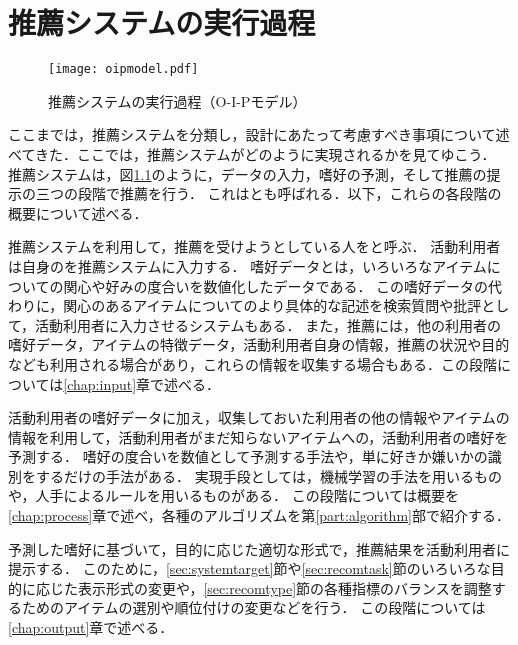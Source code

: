 \chapter{推薦システムの実行過程}
\label{chap:oipmodel}

\begin{figure}
\centering
\texttt{[image: oipmodel.pdf]}
\caption{推薦システムの実行過程（O-I-Pモデル）}
\label{fig:oipmodel}
\end{figure}

ここまでは，推薦システムを分類し，設計にあたって考慮すべき事項について述べてきた．ここでは，推薦システムがどのように実現されるかを見てゆこう．
推薦システムは，図\ref{fig:oipmodel}のように，データの入力，嗜好の予測，そして推薦の提示の三つの段階で推薦を行う．
これは\cite{sigchi:03:01}とも呼ばれる．以下，これらの各段階の概要について述べる．

\begin{description}[style=nextline]
\item[データの入力]
推薦システムを利用して，推薦を受けようとしている人をと呼ぶ．
活動利用者は自身のを推薦システムに入力する．
嗜好データとは，いろいろなアイテムについての関心や好みの度合いを数値化したデータである．
この嗜好データの代わりに，関心のあるアイテムについてのより具体的な記述を検索質問や批評として，活動利用者に入力させるシステムもある．
また，推薦には，他の利用者の嗜好データ，アイテムの特徴データ，活動利用者自身の情報，推薦の状況や目的なども利用される場合があり，これらの情報を収集する場合もある．この段階については\ref{chap:input}章で述べる．
\item[嗜好の予測]
活動利用者の嗜好データに加え，収集しておいた利用者の他の情報やアイテムの情報を利用して，活動利用者がまだ知らないアイテムへの，活動利用者の嗜好を予測する．
嗜好の度合いを数値として予測する手法や，単に好きか嫌いかの識別をするだけの手法がある．
実現手段としては，機械学習の手法を用いるものや，人手によるルールを用いるものがある．
この段階については概要を\ref{chap:process}章で述べ，各種のアルゴリズムを第\ref{part:algorithm}部で紹介する．
\item[推薦の提示]
予測した嗜好に基づいて，目的に応じた適切な形式で，推薦結果を活動利用者に提示する．
このために，\ref{sec:systemtarget}節や\ref{sec:recomtask}節のいろいろな目的に応じた表示形式の変更や，\ref{sec:recomtype}節の各種指標のバランスを調整するためのアイテムの選別や順位付けの変更などを行う．
この段階については\ref{chap:output}章で述べる．
\end{description}
